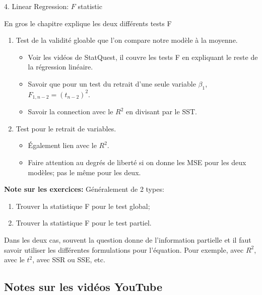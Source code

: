 \documentclass[12pt, titlepage, french]{report}
\begin{document}
\begin{CHPT_SUMM}[label = {LM-F}]{4. Linear Regression: $F$ statistic}
En gros le chapitre explique les deux différents tests F
\begin{enumerate}
	\item	Test de la validité gloable que l'on compare notre modèle à la moyenne.
	\begin{itemize}
		\item	Voir les vidéos de StatQuest, il couvre les tests F en expliquant le reste de la régression linéaire.
		\item	Savoir que pour un test du retrait d'une seule variable $\beta_{1}$, $F_{1, n - 2} = (t_{n - 2})^{2}$.
		\item	Savoir la connection avec le $R^{2}$ en divisant par le SST.
	\end{itemize}
	\item	Test pour le retrait de variables.
	\begin{itemize}
		\item	Également lien avec le $R^{2}$.
		\item	Faire attention au degrés de liberté si on donne les MSE pour les deux modèles; pas le même pour les deux.
	\end{itemize}
\end{enumerate}
\textbf{Note sur les exercices:} Généralement de 2 types:
\begin{enumerate}
	\item	Trouver la statistique F pour le test global;
	\item	Trouver la statistique F pour le test partiel. 
\end{enumerate}
Dans les deux cas, souvent la question donne de l'information partielle et il faut savoir utiliser les différentes formulations pour l'équation. Pour exemple, avec $R^{2}$, avec le $t^{2}$, avec SSR ou SSE, etc.
\end{CHPT_SUMM}

\subsection{Notes sur les vidéos YouTube}
\end{document}
